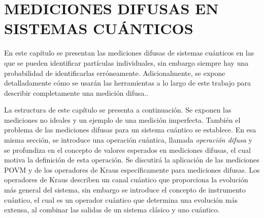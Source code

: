 \documentclass[12pt,oneside]{book}\raggedbottom{} %
\begin{document}
\begin{sloppypar}
{{\section{MEDICIONES DIFUSAS EN SISTEMAS CUÁNTICOS}
En este capítulo se presentan las mediciones difusas de sistemas cuánticos en
las que se pueden identificar partículas individuales, sin embargo siempre hay
una probabilidad de identificarlas erróneamente.  Adicionalmente, se expone
detalladamente cómo se usarán las herramientas a lo largo de este trabajo
para describir completamente una medición difusa..

La estructura de este capítulo se presenta a continuación. Se exponen las
mediciones no ideales y un ejemplo de una medición imperfecta. También el
problema de las mediciones difusas para un sistema cuántico se establece. En
esa misma sección, se introduce una operación cuántica, llamada
\textit{operación difusa} y se profundiza en el concepto de valores esperados
en mediciones difusas, el cual motiva la definición de esta operación. Se
discutirá la aplicación de las mediciones POVM y de los operadores de Kraus
específicamente para mediciones difusas. Los operadores de Kraus describen un
canal cuántico que proporciona la evolución más general del sistema, sin
embargo se introduce el concepto de instrumento cuántico, el cual es un
operador cuántico que determina una evolución más extensa, al combinar las
salidas de un sistema clásico y uno cuántico.






}}
\end{sloppypar}
\end{document}
